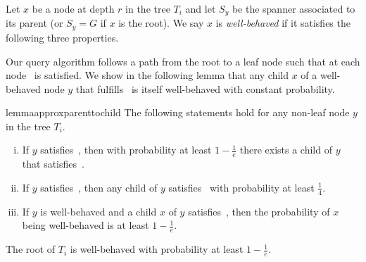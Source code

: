 \documentclass{theoretics}
\begin{document}
Let $x$ be a node at depth $r$ in the tree $T_i$ and let $S_y$ be the spanner associated to its parent
(or $S_y = G$ if $x$ is the root).
We say $x$ is \emph{well-behaved} if it satisfies the following three properties.

Our query algorithm follows a path from the root to a leaf node
such that at each node~ is satisfied. 
We show in the following lemma that any child $x$ of a well-behaved node $y$
that fulfills~ is itself well-behaved with constant probability.


\begin{restatable}{lemma}{approxparenttochild}
\label{lemma:approx_parent_to_child}
  The following statements hold for any non-leaf node $y$ in the tree $T_i$.
  \begin{enumerate}[(i)]
    \item If $y$ satisfies~, then
      with probability at least $1-\frac{1}{e}$ there exists a child of $y$ 
      that satisfies~.
    \item If $y$ satisfies~, then any child of $y$
      satisfies~ with probability at least $\frac{1}{4}$.
    \item If $y$ is well-behaved
      and a child $x$ of $y$ satisfies~, 
      then the probability of $x$ being well-behaved is at least $1-\frac{1}{e}$.
  \end{enumerate}
  The root of $T_i$ is well-behaved with probability at least $1-\frac{1}{e}$.
\end{restatable}
\end{document}

